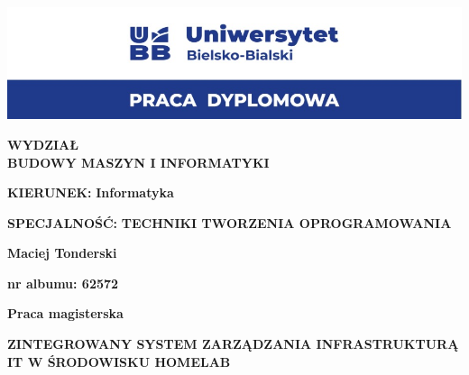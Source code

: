 \begin{titlepage}
    \begin{center}
    
    \includegraphics[width=1\textwidth]{images/logo.jpg} %
    
    \vspace{1cm}
    
    
    \textbf{\large WYDZIAŁ} \\
    \textbf{\large BUDOWY MASZYN I INFORMATYKI} \\
    
    \vspace{0.3cm}
    
    \textbf{\large KIERUNEK:} \textbf{Informatyka} \\
    
    \vspace{0.3cm}
    
    \textbf{\large SPECJALNOŚĆ:} \textbf{TECHNIKI TWORZENIA OPROGRAMOWANIA}
    
    \vspace{2cm}
    
    \textbf{\Large Maciej Tonderski} \\
    
    \vspace{0.5cm}
    
    \textbf{nr albumu:  62572} \\
    
    \vspace{0.5cm}
    
    \textbf{\large Praca magisterska}
    
    \vspace{1.5cm}
    
    \textbf{\LARGE ZINTEGROWANY SYSTEM ZARZĄDZANIA INFRASTRUKTURĄ IT W ŚRODOWISKU HOMELAB} \\
    
    \vspace{0.5cm}
    

\end{center}
\end{titlepage}
